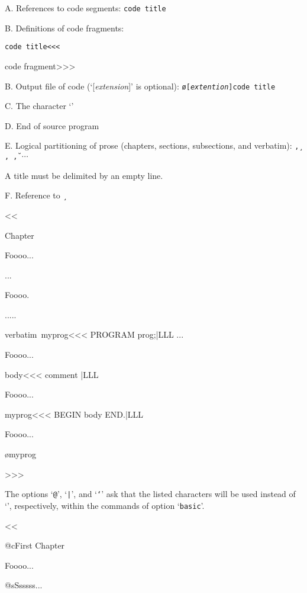 {A. References to code segments: \hfill {\tt\string\<code title\string\>}

B. Definitions of code fragments: \hfill  {\tt\string\<code title\string\><<<

\hfill                                           code fragment>>>}

B. Output file of code (`[{\it extension}]' is optional):
            \hfill{\tt\string\o[{\it extention}]\string\<code title\string\>}


C. The character `{\tt{}}'         \hfill{\tt\string\\}

D. End of source program            \hfill{\tt\string\e}

E. Logical partitioning of prose (chapters, sections, subsections, and verbatim):
\hfill\hbox{\tt\string\c, \string\s, \string\u, \string\v{$\cdots$}{}}

\noindent\phantom{E.} A title 
must be delimited by an empty line.

F. Reference to {\tt\string\ClearCode}  \hfill {\tt\string\c}




\<<<


\cFirst Chapter

Foooo...

\sSsssss...

Foooo.

\uUuuuuuu.....

\vVerbatim 
verbatim\
\<myprog\><<<
PROGRAM prog;|LLL
\cCccc...

Foooo...

\<body\><<<
{ comment } |LLL

Foooo...

\<myprog\><<<
BEGIN
  \<body\>
END.|LLL

Foooo...

\o\<myprog\>

\e
 >>>


The options `{\tt @}', `{\tt|}', and `{\tt`}' ask that the listed
characters will be used instead of `{\tt\char92}', respectively,
within the commands of option `{\tt basic}'.

\<<<


@cFirst Chapter

Foooo...

@sSsssss...

}
